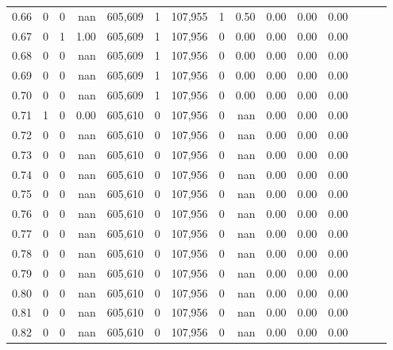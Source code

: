 \begin{tabular}{rrrrrrrrrrrrrrr}
0.66 &       0 &      0 &   nan &  605,609 &        1 &  107,955 &        1 &  0.50 &  0.00 &  0.00 &      0.00 \\
0.67 &       0 &      1 &  1.00 &  605,609 &        1 &  107,956 &        0 &  0.00 &  0.00 &  0.00 &      0.00 \\
0.68 &       0 &      0 &   nan &  605,609 &        1 &  107,956 &        0 &  0.00 &  0.00 &  0.00 &      0.00 \\
0.69 &       0 &      0 &   nan &  605,609 &        1 &  107,956 &        0 &  0.00 &  0.00 &  0.00 &      0.00 \\
0.70 &       0 &      0 &   nan &  605,609 &        1 &  107,956 &        0 &  0.00 &  0.00 &  0.00 &      0.00 \\
0.71 &       1 &      0 &  0.00 &  605,610 &        0 &  107,956 &        0 &   nan &  0.00 &  0.00 &      0.00 \\
0.72 &       0 &      0 &   nan &  605,610 &        0 &  107,956 &        0 &   nan &  0.00 &  0.00 &      0.00 \\
0.73 &       0 &      0 &   nan &  605,610 &        0 &  107,956 &        0 &   nan &  0.00 &  0.00 &      0.00 \\
0.74 &       0 &      0 &   nan &  605,610 &        0 &  107,956 &        0 &   nan &  0.00 &  0.00 &      0.00 \\
0.75 &       0 &      0 &   nan &  605,610 &        0 &  107,956 &        0 &   nan &  0.00 &  0.00 &      0.00 \\
0.76 &       0 &      0 &   nan &  605,610 &        0 &  107,956 &        0 &   nan &  0.00 &  0.00 &      0.00 \\
0.77 &       0 &      0 &   nan &  605,610 &        0 &  107,956 &        0 &   nan &  0.00 &  0.00 &      0.00 \\
0.78 &       0 &      0 &   nan &  605,610 &        0 &  107,956 &        0 &   nan &  0.00 &  0.00 &      0.00 \\
0.79 &       0 &      0 &   nan &  605,610 &        0 &  107,956 &        0 &   nan &  0.00 &  0.00 &      0.00 \\
0.80 &       0 &      0 &   nan &  605,610 &        0 &  107,956 &        0 &   nan &  0.00 &  0.00 &      0.00 \\
0.81 &       0 &      0 &   nan &  605,610 &        0 &  107,956 &        0 &   nan &  0.00 &  0.00 &      0.00 \\
0.82 &       0 &      0 &   nan &  605,610 &        0 &  107,956 &        0 &   nan &  0.00 &  0.00 &      0.00 \\

\end{tabular}
